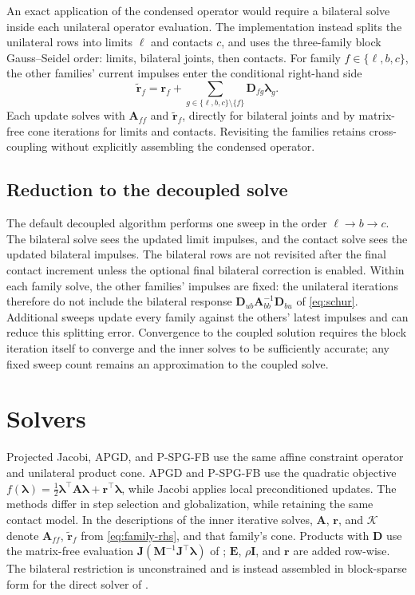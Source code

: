 \documentclass{article}
\newcommand{\M}{\mathbf{M}}
\newcommand{\Jac}{\mathbf{J}}
\newcommand{\Del}{\mathbf{D}}         %
\newcommand{\Ecomp}{\mathbf{E}}       %
\newcommand{\Aop}{\mathbf{A}}         %
\newcommand{\blam}{\boldsymbol{\lambda}}
\newcommand{\rhs}{\mathbf{r}}
\newcommand{\Kadm}{\mathcal{K}}          %
\newcommand{\reg}{\rho}                  %
\newcommand{\Id}{\mathbf{I}}
\theoremstyle{plain}
\theoremstyle{definition}
\begin{document}
An exact application of the condensed operator would require a bilateral solve
inside each unilateral operator evaluation. The implementation instead splits
the unilateral rows into limits $\ell$ and contacts $c$, and uses the
three-family block Gauss--Seidel order: limits, bilateral joints, then contacts.
For family $f\in\{\ell,b,c\}$, the other families' current impulses enter the
conditional right-hand side
\begin{equation}
\widetilde{\rhs}_f=\rhs_f+
\sum_{g\in\{\ell,b,c\}\setminus\{f\}}\Del_{fg}\blam_g.
\label{eq:family-rhs}
\end{equation}
Each update solves with $\Aop_{ff}$ and $\widetilde{\rhs}_f$, directly for
bilateral joints and by matrix-free cone iterations for limits and contacts.
Revisiting the families retains cross-coupling without explicitly assembling
the condensed operator.

\subsection{Reduction to the decoupled solve}
\label{sec:reduction}
The default decoupled algorithm performs one sweep in the order
$\ell\to b\to c$. The bilateral solve sees the updated limit impulses, and
the contact solve sees the updated bilateral impulses. The bilateral rows are
not revisited after the final contact increment unless the optional final
bilateral correction is enabled. Within each family solve, the other families'
impulses are fixed: the unilateral iterations therefore do not include the
bilateral response $\Del_{ub}\Aop_{bb}^{-1}\Del_{bu}$ of \eqref{eq:schur}.
Additional sweeps update every family against the others' latest impulses and
can reduce this splitting error. Convergence to the coupled solution requires
the block iteration itself to converge and the inner solves to be sufficiently
accurate; any fixed sweep count remains an approximation to the coupled solve.

\section{Solvers}
\label{sec:solvers}

Projected Jacobi, APGD, and P-SPG-FB use the same affine constraint operator
and unilateral product cone. APGD and P-SPG-FB use the quadratic objective
$f(\blam)=\tfrac12\blam^{\top}\Aop\blam+\rhs^{\top}\blam$, while Jacobi applies
local preconditioned updates. The methods differ in step selection and
globalization, while retaining the same contact model. In the descriptions of
the inner iterative solves, $\Aop$, $\rhs$, and $\Kadm$ denote $\Aop_{ff}$,
$\widetilde{\rhs}_f$ from \eqref{eq:family-rhs}, and that family's cone.
Products with $\Del$ use the matrix-free evaluation
$\Jac(\M^{-1}\Jac^{\top}\blam)$ of ; $\Ecomp$, $\reg\Id$, and
$\rhs$ are added row-wise. The bilateral restriction is unconstrained and is
instead assembled in block-sparse form for the direct solver of
.
\end{document}
